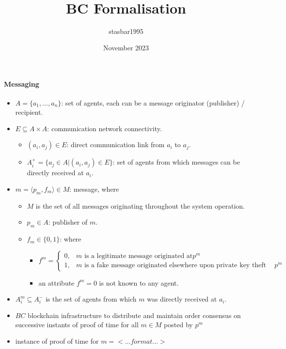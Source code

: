\documentclass{article}
\title{BC Formalisation}
\author{stasbar1995 }
\date{November 2023}
\begin{document}
\maketitle

\paragraph{Messaging}

\begin{itemize}
    \item $A = \{a_1, \ldots, a_n\}$: set of agents, each can be a message originator (publisher) / recipient.
    \item $E \subseteq A \times A$: communication network connectivity. \begin{itemize}
        \item $(a_i, a_j) \in E$: direct communication link from $a_i$ to $a_j$.
        \item $A_i^{+} = \{a_j \in A | (a_i, a_j) \in E\}$: set of agents from which messages can be directly received at $a_i$.
    \end{itemize}
    
    
    \item $m = \langle p_m, f_m \rangle \in M$: message, where \begin{itemize} 
        \item $M$ is the set of all messages originating throughout the system operation.
        \item $p_m \in A$: publisher of $m$.
        \item $f_m \in \{0, 1\}$: where \begin{itemize}  
            \item \[
            f^m = \left\{
            \begin{array}{ll}
                  0, & m\textrm{ is a legitimate message originated at} p^m \\
                  1, & m\textrm{ is a fake message originated elsewhere upon private key theft from} p^m
            \end{array} 
            \right.
            \]
            \item an attribute $f^m=0$ is not known to any agent.
        \end{itemize}
    \end{itemize}
    \item \( A_i^m \subseteq A_i^-\) is the set of agents from which \( m \) was directly received at \(a_i\).
    \item \( BC \) blockchain infrastructure to distribute and maintain order consensus on successive instants of proof of time for all \( m \in M \) posted by \( p^m\)
    \item instance of proof of time for \(m=<\dots{} format \dots{}>\)    
\end{itemize}
\end{document}

